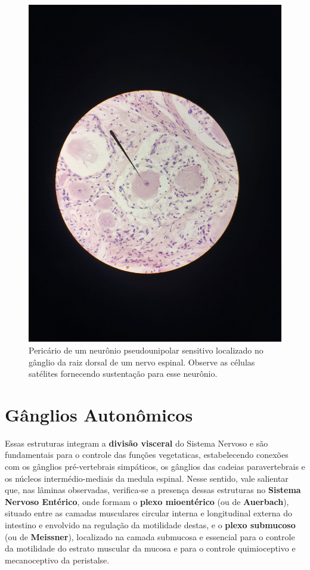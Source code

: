 \documentclass[
]{book}
\begin{document}
\begin{figure}
\centering
\includegraphics{images/neuro-celssatelite.jpeg}
\caption{\label{fig:unnamed-chunk-12}Pericário de um neurônio pseudounipolar sensitivo localizado no gânglio da raiz dorsal de um nervo espinal. Observe as células satélites fornecendo sustentação para esse neurônio.}
\end{figure}

\hypertarget{guxe2nglios-autonuxf4micos}{%
\section{Gânglios Autonômicos}\label{guxe2nglios-autonuxf4micos}}

Essas estruturas integram a \textbf{divisão visceral} do Sistema Nervoso e são fundamentais para o controle das funções vegetaticas, estabelecendo conexões com os gânglios pré-vertebrais simpáticos, os gânglios das cadeias paravertebrais e os núcleos intermédio-mediais da medula espinal. Nesse sentido, vale salientar que, nas lâminas observadas, verifica-se a presença dessas estruturas no \textbf{Sistema Nervoso Entérico}, onde formam o \textbf{plexo mioentérico} (ou de \textbf{Auerbach}), situado entre as camadas musculares circular interna e longitudinal externa do intestino e envolvido na regulação da motilidade destas, e o \textbf{plexo submucoso} (ou de \textbf{Meissner}), localizado na camada submucosa e essencial para o controle da motilidade do estrato muscular da mucosa e para o controle quimioceptivo e mecanoceptivo da peristalse.
\end{document}
